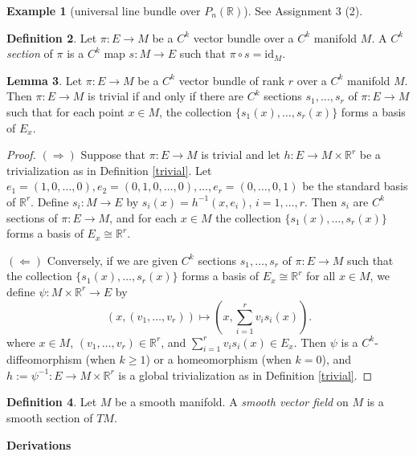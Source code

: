 \documentclass{amsart}
\numberwithin{equation}{section}
\newcommand{\bR}{\mathbb{R}}
\theoremstyle{definition}
\newtheorem{definition}{Definition} [section]
\newtheorem{example}[definition]{Example}
\theoremstyle{theorem}
\newtheorem{lemma}[definition]{Lemma}
\begin{document}
\begin{example}[universal line bundle over $P_n(\bR)$] 
See Assignment 3 (2).
\end{example}

\begin{definition}
Let $\pi : E \to M$ be a $C^k$ vector bundle over a $C^k$ manifold $M$. A {\em $C^k$ section} 
of $\pi$ is a $C^k$ map $s : M \to E$ such that $\pi \circ s = \text{id}_M$. 
\end{definition}

\begin{lemma}
Let $\pi : E \to M$ be a $C^k$ vector bundle of rank $r$ over a $C^k$ manifold $M$. Then $\pi : E \to M$ is trivial 
if and only if there are $C^k$ sections $s_1, \ldots, s_r$ of $\pi:E\to M$ such that for each point $x \in M$, 
the collection $\{s_1(x), \ldots, s_r(x)\}$ forms a basis of $E_x$. 
\end{lemma}

\begin{proof}
$(\Rightarrow)$ Suppose that $\pi :E \to M$ is trivial and let $h : E \to M \times \bR^r$ be a trivialization as in Definition \ref{trivial}.
Let $e_1=(1,0,\ldots,0), e_2=(0,1,0,\ldots,0), \ldots, e_r =(0,\ldots, 0,1)$ be the standard basis of $\bR^r$.
Define $s_i: M\to E$ by $s_i(x)=h^{-1}(x, e_i)$, $i=1,\ldots,r$. Then $s_i$ are $C^k$ sections of $\pi:E\to M$, and
for each $x\in M$ the collection $\{s_1(x), \ldots, s_r(x)\}$ forms a basis of $E_x\cong \bR^r$.

\noindent
$(\Leftarrow)$ Conversely, if we are given $C^k$ sections $s_1,\ldots,s_r$ of $\pi:E\to M$ such that
the collection $\{ s_1(x),\ldots, s_r(x)\}$ forms a basis of $E_x\cong \bR^r$ for all $x\in M$, 
we define $\psi: M \times \mathbb{R}^r \to E$ by  
\[
(x,(v_1,\ldots, v_r)) \mapsto (x, \sum_{i=1}^r v_i s_i(x)).
\]
where $x\in M$, $(v_1,\ldots, v_r)\in \bR^r$, and $\sum_{i=1}^r v_i s_i(x)\in E_x$. Then 
$\psi$ is a $C^k$-diffeomorphism (when $k\geq 1$) or a homeomorphism (when $k=0$), and
$h:=\psi^{-1}:E\to M\times \bR^r$ is a global trivialization as in Definition \ref{trivial}. 
\end{proof}

\begin{definition}
Let $M$ be a smooth manifold. A {\em smooth vector field} on $M$ is a smooth section of $TM$. 
\end{definition}


\bigskip

\noindent
{\large \bf Derivations}
\end{document}
